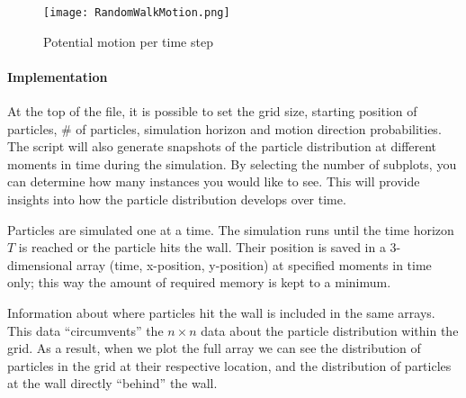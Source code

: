 \begin{figure}[htb]
    \label{fig:RandomWalkMotion}
	\centering
	\texttt{[image: RandomWalkMotion.png]}       
	\caption{Potential motion per time step}
\end{figure}


\paragraph{Implementation} 
At the top of the file, it is possible to set the grid size, starting position of particles, \# of particles, simulation horizon and motion direction probabilities. The script will also generate snapshots of the particle distribution at different moments in time during the simulation. By selecting the number of subplots, you can determine how many instances you would like to see. This will provide insights into how the particle distribution develops over time. \newline

Particles are simulated one at a time. The simulation runs until the time horizon $T$ is reached or the particle hits the wall. Their position is saved in a 3-dimensional array (time, x-position, y-position) at specified moments in time only; this way the amount of required memory is kept to a minimum. %
\newline

Information about where particles hit the wall is included in the same arrays. This data ``circumvents'' the $n \times n$ data about the particle distribution within the grid. As a result, when we plot the full array we can see the distribution of particles in the grid at their respective location, and the distribution of particles at the wall directly ``behind'' the wall.\newline

